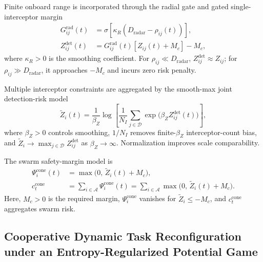 \documentclass{cja}
\begin{document}
Finite onboard range is incorporated through the radial gate and gated single-interceptor margin
\begin{equation}
\begin{aligned}
G_{ij}^{\mathrm{rad}}(t)
&=\sigma\!\left[\kappa_R\left(D_{\mathrm{radar}}-\rho_{ij}(t)\right)\right],\\
Z_{ij}^{\mathrm{det}}(t)
&=G_{ij}^{\mathrm{rad}}(t)\left[Z_{ij}(t)+M_c\right]-M_c,
\end{aligned}
\end{equation}
where $\kappa_R>0$ is the smoothing coefficient. For $\rho_{ij}\ll D_{\mathrm{radar}}$, $Z_{ij}^{\mathrm{det}}\approx Z_{ij}$; for $\rho_{ij}\gg D_{\mathrm{radar}}$, it approaches $-M_c$ and incurs zero risk penalty.

Multiple interceptor constraints are aggregated by the smooth-max joint detection-risk model
\begin{equation}
\widetilde Z_i(t)
=
\frac{1}{\beta_Z}
\log\left[
\frac{1}{N_I}
\sum_{j\in\mathcal{D}}
\exp\!\bigl(\beta_Z Z_{ij}^{\mathrm{det}}(t)\bigr)
\right],
\end{equation}
where $\beta_Z>0$ controls smoothing, $1/N_I$ removes finite-$\beta_Z$ interceptor-count bias, and $\widetilde Z_i\to\max_{j\in\mathcal D}Z_{ij}^{\mathrm{det}}$ as $\beta_Z\to\infty$. Normalization improves scale comparability.

The swarm safety-margin model is
\begin{equation}
\begin{aligned}
\Psi_i^{\mathrm{cone}}(t)
&=\max\bigl(0,\, \widetilde Z_i(t)+M_c\bigr),\\
c_t^{\mathrm{cone}}
&=\sum_{i\in\mathcal{A}}\Psi_i^{\mathrm{cone}}(t)
=\sum_{i\in\mathcal{A}}\max\bigl(0,\, \widetilde Z_i(t)+M_c\bigr).
\end{aligned}
\end{equation}
Here, $M_c>0$ is the required margin, $\Psi_i^{\mathrm{cone}}$ vanishes for $\widetilde Z_i\le-M_c$, and $c_t^{\mathrm{cone}}$ aggregates swarm risk.

\subsection{Cooperative Dynamic Task Reconfiguration under an Entropy-Regularized Potential Game}
\end{document}
